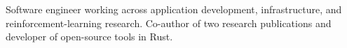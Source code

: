 Software engineer working across application development, infrastructure, and reinforcement-learning research. Co-author of two research publications and developer of open-source tools in Rust.
